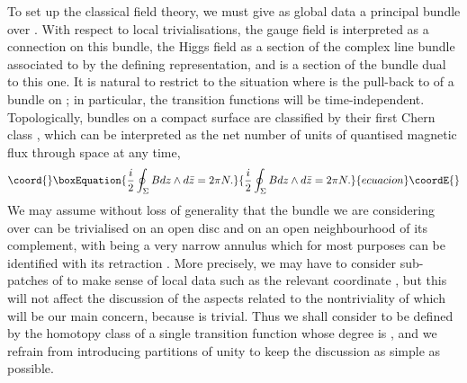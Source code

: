 \documentclass[a4paper,11pt]{article}
\begin{document}
To set up the classical field theory, we must give as global data a
principal \coordHE{} bundle \coordHE{} over \coordHE{}. With respect
to local trivialisations, the gauge
field is interpreted as
a connection on this bundle, the Higgs field as a section of 
the complex line bundle associated to \coordHE{} by the defining 
representation, and \myHighlight{$\bar{\phi}$}\coordHE{} is a section of the bundle dual to this one.
It is natural to restrict to the situation 
where \coordHE{} is the pull-back to \coordHE{} of a 
\coordHE{} bundle on \myHighlight{$\Sigma$}\coordHE{}; in particular, the transition functions
will be time-independent. Topologically, \coordHE{} bundles on a compact
surface are classified by their first Chern class \coordHE{}, 
which can be interpreted as the net number of units of quantised magnetic
flux through space at any time,
\begin{equation}\coord{}\boxEquation{\label{qflux}
\frac{i}{2} \oint_{\Sigma}Bdz\wedge d\bar{z}=2\pi N.
}{\frac{i}{2} \oint_{\Sigma}Bdz\wedge d\bar{z}=2\pi N.
}{ecuacion}\coordE{}\end{equation}
We may assume without loss of generality that the bundle we are
considering over \myHighlight{$\Sigma$}\coordHE{} can be trivialised on an open disc 
\coordHE{} and on an open neighbourhood \coordHE{} of its
complement, with \coordHE{} being a very narrow annulus
which for most purposes can be identified with its retraction
\coordHE{}. More precisely, we may have to 
consider sub-patches of \coordHE{} to make sense of local data such as
the relevant coordinate \coordHE{}, but this will not affect the discussion
of the aspects related to the nontriviality of \coordHE{} which will be 
our main concern, because \coordHE{} is trivial. Thus we shall 
consider \coordHE{} to be defined by the homotopy class of a single
transition function \coordHE{} whose 
degree is \coordHE{}, and we refrain from introducing partitions of unity 
to keep the discussion as simple as possible.
\end{document}
